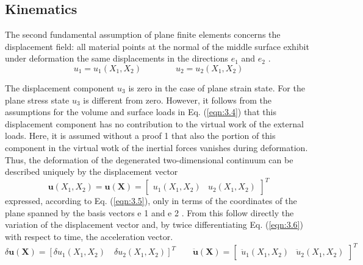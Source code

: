 \subsection{Kinematics}
The second fundamental assumption of plane finite elements concerns the displacement field:
all material points at the normal of the middle surface exhibit under deformation the same
displacements in the directions $e_1$ and $e_2$ .
\begin{equation}
\label{eqn:3.5}
 u_{1}=u_{1}\left(X_{1}, X_{2}\right) \qquad \qquad u_{2}=u_{2}\left(X_{1}, X_{2}\right) 
 \label{eqn:3.5}
\end{equation}

The displacement component $u_3$ is zero in the case of plane strain state. For the plane stress
state $u_ 3$ is different from zero. However, it follows from the assumptions for the volume and surface loads in Eq. (\ref{eqn:3.4}) that this displacement component has no contribution to the virtual
work of the external loads. Here, it is assumed without a proof 1 that also the portion of this component in the virtual wotk of the inertial forces vanishes during deformation. Thus, the
deformation of the degenerated two-dimensional continuum can be described uniquely by the displacement vector
\begin{equation}
 \boldsymbol{u}\left(X_{1}, X_{2}\right)=\boldsymbol{u}(\boldsymbol{X})=\left[\begin{array}{ll}u_{1}\left(X_{1}, X_{2}\right) & u_{2}\left(X_{1}, X_{2}\right)\end{array}\right]^{T} 
 \label{eqn:3.6}
\end{equation}
expressed, according to Eq. (\ref{eqn:3.5}), only in terms of the coordinates of the plane spanned by the
basis vectors e 1 and e 2 . From this follow directly the variation of the displacement vector and,
by twice differentiating Eq. (\ref{eqn:3.6}) with respect to time, the acceleration vector.
\begin{equation}
\label{eqn:3.7}
 \delta \boldsymbol{u}(\boldsymbol{X})=\left[\delta u_{1}\left(X_{1}, X_{2}\right) \quad \delta u_{2}\left(X_{1}, X_{2}\right)\right]^{T} \qquad \ddot{\boldsymbol{u}}(\boldsymbol{X})=\left[\begin{array}{ll}\ddot{u}_{1}\left(X_{1}, X_{2}\right) & \ddot{u}_{2}\left(X_{1}, X_{2}\right)\end{array}\right]^{T} 
\end{equation}

